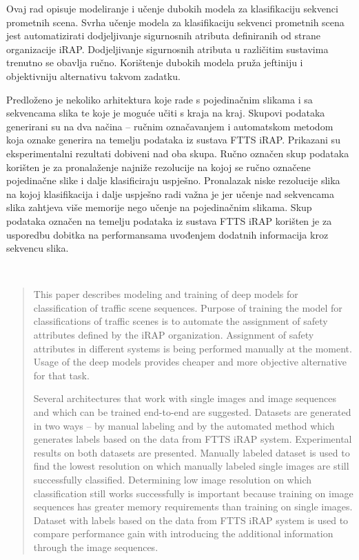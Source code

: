 \documentclass[times, utf8, diplomski, numeric]{fer}
\begin{document}
\begin{sazetak}
Ovaj rad opisuje modeliranje i učenje dubokih modela za klasifikaciju sekvenci prometnih scena.
Svrha učenje modela za klasifikaciju sekvenci prometnih scena jest automatizirati dodjeljivanje sigurnosnih atributa definiranih od strane organizacije iRAP.
Dodjeljivanje sigurnosnih atributa u različitim sustavima trenutno se obavlja ručno.
Korištenje dubokih modela pruža jeftiniju i objektivniju alternativu takvom zadatku.

Predloženo je nekoliko arhitektura koje rade s pojedinačnim slikama i sa sekvencama slika te koje je moguće učiti s kraja na kraj.
Skupovi podataka generirani su na dva načina -- ručnim označavanjem i automatskom metodom koja oznake generira na temelju podataka iz sustava FTTS iRAP.
Prikazani su eksperimentalni rezultati dobiveni nad oba skupa.
Ručno označen skup podataka korišten je za pronalaženje najniže rezolucije na kojoj se ručno označene pojedinačne slike i dalje klasificiraju uspješno. 
Pronalazak niske rezolucije slika na kojoj klasifikacija i dalje uspješno radi važna je jer učenje nad sekvencama slika zahtjeva više memorije nego učenje na pojedinačnim slikama.
Skup podataka označen na temelju podataka iz sustava FTTS iRAP korišten je za usporedbu dobitka na performansama uvođenjem dodatnih informacija kroz sekvencu slika.


 \\
\end{sazetak}


\begin{abstract}
This paper describes modeling and training of deep models for classification of traffic scene sequences.
Purpose of training the model for classifications of traffic scenes is to automate the assignment of safety attributes defined by the iRAP organization.
Assignment of safety attributes in different systems is being performed manually at the moment.
Usage of the deep models provides cheaper and more objective alternative for that task.

Several architectures that work with single images and image sequences and which can be trained end-to-end are suggested.
Datasets are generated in two ways -- by manual labeling and by the automated method which generates labels based on the data from FTTS iRAP system.
Experimental results on both datasets are presented.
Manually labeled dataset is used to find the lowest resolution on which manually labeled single images are still successfully classified.
Determining low image resolution on which classification still works successfully is important because training on image sequences has greater memory requirements than training on single images.
Dataset with labels based on the data from FTTS iRAP system is used to compare performance gain with introducing the additional information through the image sequences.

\end{abstract}
\end{document}
